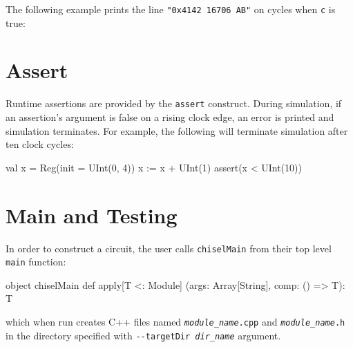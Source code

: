 \documentclass[10pt,twocolumn]{article}
\def\code#1{{\small\tt #1}}
\begin{document}
The following example prints the line \code{"0x4142 16706 AB"} on cycles when
\code{c} is true:


\section{Assert}

Runtime assertions are provided by the \code{assert} construct.  During
simulation, if an assertion's argument is false on a rising clock edge,
an error is printed and simulation terminates.  For example, the following
will terminate simulation after ten clock cycles:

\begin{scala}
val x = Reg(init = UInt(0, 4))
x := x + UInt(1)
assert(x < UInt(10))
\end{scala}

\section{Main and Testing}

In order to construct a circuit, 
the user calls \code{chiselMain} from their top level \code{main} function:

\begin{scala}
object chiselMain {
  def apply[T <: Module]
    (args: Array[String], comp: () => T): T
}
\end{scala}

\noindent
which when run creates C++ files named
\code{{\it module\_name}.cpp} and \code{{\it module\_name}.h} in
the directory specified with
\code{-{-}targetDir {\it dir\_name}} argument.
\end{document}
